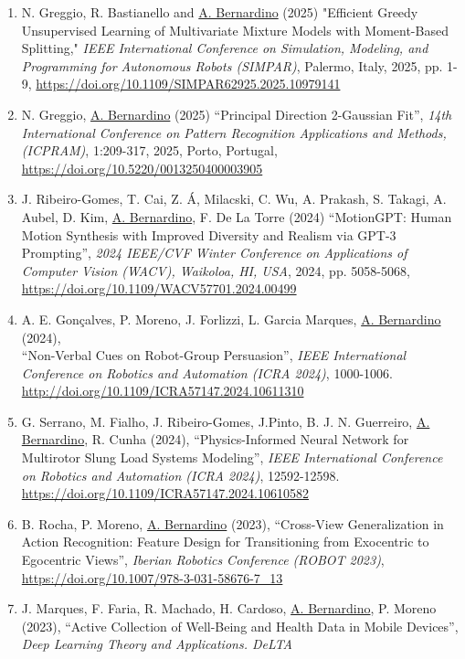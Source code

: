 \begin{enumerate}
  Designing Interactive Systems Conference, pp 508~--~512.
  \url{https://doi.org/10.1145/3715668.3736344}
\item
  N. Greggio, R. Bastianello and \ul{A. Bernardino} (2025) "Efficient
  Greedy Unsupervised Learning of Multivariate Mixture Models with
  Moment-Based Splitting," \emph{IEEE International Conference on
  Simulation, Modeling, and Programming for Autonomous Robots (SIMPAR)},
  Palermo, Italy, 2025, pp. 1-9,
  \url{https://doi.org/10.1109/SIMPAR62925.2025.10979141}
\item
  N. Greggio, \ul{A. Bernardino} (2025) ``Principal Direction 2-Gaussian
  Fit'', \emph{14th International Conference on Pattern Recognition
  Applications and Methods, (ICPRAM)}, 1:209-317, 2025, Porto, Portugal,
  \url{https://doi.org/10.5220/0013250400003905}
\item
  J. Ribeiro-Gomes, T. Cai, Z. Á, Milacski, C. Wu, A. Prakash, S.
  Takagi, A. Aubel, D. Kim, \ul{A. Bernardino}, F. De La Torre (2024)
  ``MotionGPT: Human Motion Synthesis with Improved Diversity and
  Realism via GPT-3 Prompting'', \emph{2024 IEEE/CVF Winter Conference
  on Applications of Computer Vision (WACV), Waikoloa, HI, USA}, 2024,
  pp. 5058-5068, \url{https://doi.org/10.1109/WACV57701.2024.00499}
\item
  A. E. Gonçalves, P. Moreno, J. Forlizzi, L. Garcia Marques, \ul{A.
  Bernardino} (2024),\\
  ``Non-Verbal Cues on Robot-Group Persuasion'', \emph{IEEE
  International Conference on Robotics and Automation (ICRA 2024)},
  1000-1006. \url{http://doi.org/10.1109/ICRA57147.2024.10611310}
\item
  G. Serrano, M. Fialho, J. Ribeiro-Gomes, J.Pinto, B. J. N. Guerreiro,
  \ul{A. Bernardino}, R. Cunha (2024), ``Physics-Informed Neural Network
  for Multirotor Slung Load Systems Modeling'', \emph{IEEE International
  Conference on Robotics and Automation (ICRA 2024)}, 12592-12598.
  \url{https://doi.org/10.1109/ICRA57147.2024.10610582}
\item
  B. Rocha, P. Moreno, \ul{A. Bernardino} (2023), ``Cross-View
  Generalization in Action Recognition: Feature Design for Transitioning
  from Exocentric to Egocentric Views'', \emph{Iberian Robotics
  Conference (ROBOT 2023)},
  \url{https://doi.org/10.1007/978-3-031-58676-7_13}
\item
  J. Marques, F. Faria, R. Machado, H. Cardoso, \ul{A. Bernardino}, P.
  Moreno (2023), ``Active Collection of Well-Being and Health Data in
  Mobile Devices'', \emph{Deep Learning Theory and Applications. DeLTA
}
\end{enumerate}
